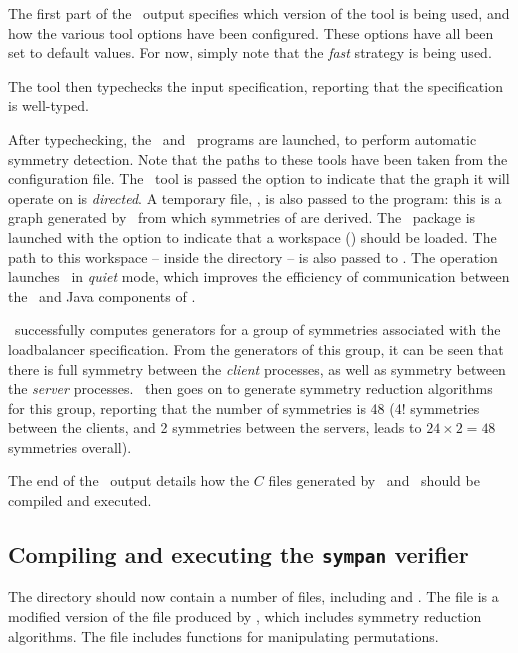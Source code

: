 The first part of the \topspin\ output specifies which version of
the tool is being used, and how the various tool options have been
configured. These options have all been set to default values.  For
now, simply note that the \emph{fast} strategy is being used.

The tool then typechecks the input specification, reporting that the
specification is well-typed.

After typechecking, the \saucy\ and \gap\ programs are launched, to
perform automatic symmetry detection.  Note that the paths to these
tools have been taken from the configuration file.  The \saucy\ tool
is passed the  option to indicate that the graph it will
operate on is \emph{directed}.  A temporary file,
, is also passed to the program: this is a graph
generated by \topspin\ from which symmetries of
 are derived.  The \gap\ package is launched
with the  option to indicate that a workspace
() should be loaded.  The
path to this workspace --  inside the
 directory -- is also passed to \gap.  The
 operation launches \gap\ in \emph{quiet} mode, which
improves the efficiency of communication between the \gap\ and Java
components of \topspin.

\topspin\ successfully computes generators for a group of symmetries
associated with the loadbalancer specification.  From the generators
of this group, it can be seen that there is full symmetry between
the \emph{client} processes, as well as symmetry between the
\emph{server} processes.  \topspin\ then goes on to generate
symmetry reduction algorithms for this group, reporting that the
number of symmetries is 48 (4! symmetries between the clients, and 2
symmetries between the servers, leads to $24\times 2=48$ symmetries
overall).

The end of the \topspin\ output details how the $C$ files generated
by \spin\ and \topspin\ should be compiled and executed.

\subsection{Compiling and executing the {\bf \texttt{sympan}} verifier}

The  directory should now contain a number of
files, including  and .  The
 file is a modified version of the 
file produced by \spin, which includes symmetry reduction
algorithms.  The  file includes functions for
manipulating permutations.

